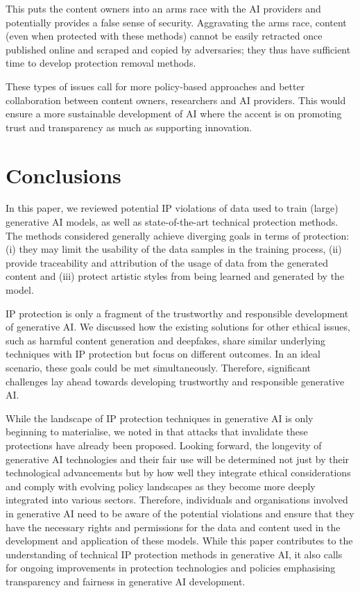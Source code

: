 \documentclass[conference,table]{IEEEtran}
\begin{document}
This puts the content owners into an arms race with the AI providers and potentially provides a false sense of security.
Aggravating the arms race, content (even when protected with these methods) cannot be easily retracted once published online and scraped and copied by adversaries; they thus have sufficient time to develop protection removal methods.

These types of issues call for more policy-based approaches and better collaboration between content owners, researchers and AI providers. 
This would ensure a more sustainable development of AI where the accent is on promoting trust and transparency as much as supporting innovation. 


\section{Conclusions}\label{sec:conclusion}
In this paper, we reviewed potential IP violations of data used to train (large) generative AI models, as well as state-of-the-art technical protection methods.
The methods considered generally achieve diverging goals in terms of protection: (i) they may limit the usability of the data samples in the training process, (ii) provide traceability and attribution of the usage of data from the generated content and (iii) protect artistic styles from being learned and generated by the model.

IP protection is only a fragment of the trustworthy and responsible development of generative AI.
We discussed how the existing solutions for other ethical issues, such as harmful content generation and deepfakes, share similar underlying techniques with IP protection but focus on different outcomes.
In an ideal scenario, these goals could be met simultaneously. Therefore, significant challenges lay ahead towards developing trustworthy and responsible generative AI. 

While the landscape of IP protection techniques in generative AI is only beginning to materialise, we noted in  that attacks that invalidate these protections have already been proposed.
Looking forward, the longevity of generative AI technologies and their fair use will be determined not just by their technological advancements but by how well they integrate ethical considerations and comply with evolving policy landscapes as they become more deeply integrated into various sectors.
Therefore, individuals and organisations involved in generative AI need to be aware of the potential violations and ensure that they have the necessary rights and permissions for the data and content used in the development and application of these models. 
While this paper contributes to the understanding of technical IP protection methods in generative AI, it also calls for ongoing improvements in protection technologies and policies emphasising transparency and fairness in generative AI development.

\balance


  
\end{document}
